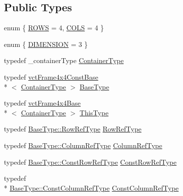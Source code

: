 \subsection*{Public Types}
\begin{DoxyCompactItemize}
\item 
enum \{ \hyperlink{classvct_frame4x4_base_a26b1c1cefff2caadb4e73d1a53bbb8cea5a040cca1b631b6453854b7d60ad2e83}{R\-O\-W\-S} = 4, 
\hyperlink{classvct_frame4x4_base_a26b1c1cefff2caadb4e73d1a53bbb8cea08b2236e42ee2a77673bf057cbd24599}{C\-O\-L\-S} = 4
 \}
\item 
enum \{ \hyperlink{classvct_frame4x4_base_a607a47903dc265e8d207c15dc7ca463ea10556ead0164a0b80c3a2f3e5f28b3a2}{D\-I\-M\-E\-N\-S\-I\-O\-N} = 3
 \}
\item 
typedef \-\_\-container\-Type \hyperlink{classvct_frame4x4_base_a3ae00d9c053676770458dc28ad41cc5a}{Container\-Type}
\item 
typedef \hyperlink{classvct_frame4x4_const_base}{vct\-Frame4x4\-Const\-Base}\\*
$<$ \hyperlink{classvct_frame4x4_base_a3ae00d9c053676770458dc28ad41cc5a}{Container\-Type} $>$ \hyperlink{classvct_frame4x4_base_afdce5a53de5e8e244a2e05b4843226bb}{Base\-Type}
\item 
typedef \hyperlink{classvct_frame4x4_base}{vct\-Frame4x4\-Base}\\*
$<$ \hyperlink{classvct_frame4x4_base_a3ae00d9c053676770458dc28ad41cc5a}{Container\-Type} $>$ \hyperlink{classvct_frame4x4_base_af6dcf167c0c3965872a095ce28853598}{This\-Type}
\item 
typedef \hyperlink{classvct_frame4x4_const_base_a4032e45bc1de2cf3ef9436aef57f1595}{Base\-Type\-::\-Row\-Ref\-Type} \hyperlink{classvct_frame4x4_base_a25703f0acac48328ee260245ddf4b2af}{Row\-Ref\-Type}
\item 
typedef \hyperlink{classvct_frame4x4_const_base_aa62cf0655339f6cbbe4c0b4323fe8dcf}{Base\-Type\-::\-Column\-Ref\-Type} \hyperlink{classvct_frame4x4_base_a5c1b952e27a3cafa0cc196c2a36c33e7}{Column\-Ref\-Type}
\item 
typedef \hyperlink{classvct_frame4x4_const_base_af18cadccba2812e0d3cad82f43583ab0}{Base\-Type\-::\-Const\-Row\-Ref\-Type} \hyperlink{classvct_frame4x4_base_a75f2ff66cb8cdd2322c576e7be0b94a1}{Const\-Row\-Ref\-Type}
\item 
typedef \\*
\hyperlink{classvct_frame4x4_const_base_a12760de72da52fc0917ad17373d369f3}{Base\-Type\-::\-Const\-Column\-Ref\-Type} \hyperlink{classvct_frame4x4_base_a3942845e934c9ac1ede2d499f92a760b}{Const\-Column\-Ref\-Type}

\end{DoxyCompactItemize}
